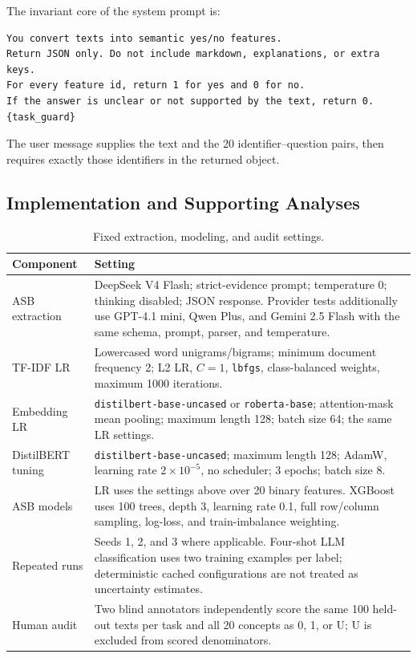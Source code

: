 The invariant core of the system prompt is:
\begin{lstlisting}
You convert texts into semantic yes/no features.
Return JSON only. Do not include markdown, explanations, or extra keys.
For every feature id, return 1 for yes and 0 for no.
If the answer is unclear or not supported by the text, return 0.
{task_guard}
\end{lstlisting}
The user message supplies the text and the 20 identifier--question pairs, then requires exactly those identifiers in the returned object.

\subsection{Implementation and Supporting Analyses}

\begin{table}[!htbp]
\centering
\caption{Fixed extraction, modeling, and audit settings.}
\label{tab:compact-reproducibility}
\small
\setlength{\tabcolsep}{4pt}
\begin{tabular}{@{}L{2.7cm}L{8.5cm}@{}}
\toprule
Component & Setting \\
\midrule
ASB extraction & DeepSeek V4 Flash; strict-evidence prompt; temperature 0; thinking disabled; JSON response. Provider tests additionally use GPT-4.1 mini, Qwen Plus, and Gemini 2.5 Flash with the same schema, prompt, parser, and temperature. \\
TF-IDF LR & Lowercased word unigrams/bigrams; minimum document frequency 2; L2 LR, $C=1$, \texttt{lbfgs}, class-balanced weights, maximum 1000 iterations. \\
Embedding LR & \texttt{distilbert-base-uncased} or \texttt{roberta-base}; attention-mask mean pooling; maximum length 128; batch size 64; the same LR settings. \\
DistilBERT tuning & \texttt{distilbert-base-uncased}; maximum length 128; AdamW, learning rate $2\times10^{-5}$, no scheduler; 3 epochs; batch size 8. \\
ASB models & LR uses the settings above over 20 binary features. XGBoost uses 100 trees, depth 3, learning rate 0.1, full row/column sampling, log-loss, and train-imbalance weighting. \\
Repeated runs & Seeds 1, 2, and 3 where applicable. Four-shot LLM classification uses two training examples per label; deterministic cached configurations are not treated as uncertainty estimates. \\
Human audit & Two blind annotators independently score the same 100 held-out texts per task and all 20 concepts as 0, 1, or U; U is excluded from scored denominators. \\
\bottomrule
\end{tabular}
\end{table}

